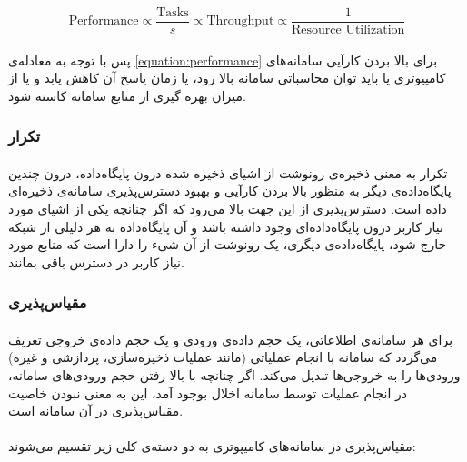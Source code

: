 \begin{latin}
	\begin{equation} \label{equation:performance}
		\text{Performance}
		\propto
		\frac{\text{Tasks}}{s} %
		\propto
		\text{Throughput} %
		\propto
		\frac{1}{\text{Resource Utilization}}
	\end{equation}
\end{latin}

\paragraph*{}
پس با توجه به معادله‌ی
\ref{equation:performance}
برای بالا بردن کارآیی سامانه‌های کامپیوتری یا باید توان محاسباتی سامانه بالا رود، یا زمان پاسخ آن کاهش یابد و یا از میزان بهره گیری از منابع سامانه کاسته شود.

\subsubsection*{تکرار }
\paragraph*{}
تکرار به معنی ذخیره‌ی رونوشت
از اشیای ذخیره شده درون پایگاه‌داده، درون چندین پایگاه‌داده‌ی دیگر به منظور بالا بردن کارآیی و بهبود
دسترس‌پذیری
سامانه‌ی ذخیره‌ای داده است. دسترس‌پذیری از این جهت بالا می‌رود که اگر چنانچه یکی از اشیای مورد نیاز کاربر درون پایگاه‌داده‌ای وجود داشته باشد و آن پایگاه‌داده به هر دلیلی از شبکه خارج شود، پایگاه‌داده‌ی دیگری، یک رونوشت از آن شی‌ء را دارا است که منابع مورد نیاز کاربر در دسترس باقی بمانند.

\subsubsection*{مقیاس‌پذیری }
\paragraph*{}
برای هر سامانه‌ی اطلاعاتی، یک حجم داده‌ی ورودی و یک حجم داده‌ی خروجی تعریف می‌گردد که سامانه با انجام عملیاتی (مانند عملیات ذخیره‌سازی، پردازشی و غیره) ورودی‌ها را به خروجی‌ها تبدیل می‌کند. اگر چنانچه با بالا رفتن حجم ورودی‌های سامانه، در انجام عملیات توسط سامانه اخلال بوجود آمد، این به معنی نبودن خاصیت مقیاس‌پذیری در آن سامانه است.

\paragraph*{}
مقیاس‌پذیری در سامانه‌های کامیپوتری به دو دسته‌ی کلی زیر تقسیم می‌شوند:

